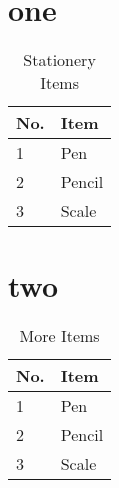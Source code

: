 \documentclass{article}
\begin{document}
    \tableofcontents
    \listoftables
	
    \section{one}
    \lipsum[1-2]

    \begin{table}[b]
        \centering
        \begin{tabular}{|l|l|}
	        \hline
	        No. & Item\\
	        \hline
	        1 & Pen\\
	        \hline
	        2 & Pencil\\
	        \hline
	        3 & Scale\\
	        \hline
        \end{tabular}
        \caption{Stationery Items}
    \end{table}

    \section{two}
    \lipsum[1-3]
    
    \begin{table}[h]
    	\centering
    	\begin{tabular}{|l|l|}
    		\hline
    		No. & Item\\
    		\hline
    		1 & Pen\\
    		\hline
    		2 & Pencil\\
    		\hline
    		3 & Scale\\
    		\hline
    	\end{tabular}
    	\caption{More Items}
    \end{table}
\end{document}
